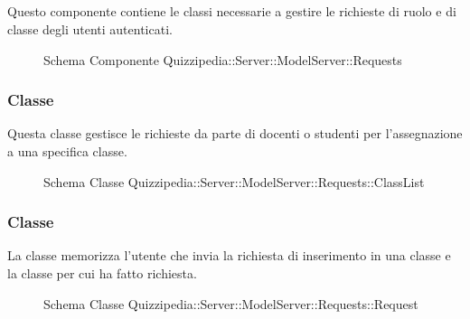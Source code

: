 \subsection{}
Questo componente contiene le classi necessarie a gestire le richieste di ruolo e di classe degli utenti autenticati.
\begin{figure}[H]
\centering
\noindent{}
\caption[Schema Componente Quizzipedia::Server::ModelServer::Requests]{Schema Componente Quizzipedia::Server::ModelServer::Requests}
\end{figure}
\subsubsection{Classe }
Questa classe gestisce le richieste da parte di docenti o studenti per l'assegnazione a una specifica classe.
\begin{figure}[H]
\centering
\noindent{}
\caption[Schema Classe ClassList]{Schema Classe Quizzipedia::Server::ModelServer::Requests::ClassList}
\end{figure}
\subsubsection{Classe }
La classe memorizza l'utente che invia la richiesta di inserimento in una classe e la classe per cui ha fatto richiesta.
\begin{figure}[H]
\centering
\noindent{}
\caption[Schema Classe Request]{Schema Classe Quizzipedia::Server::ModelServer::Requests::Request}
\end{figure}
